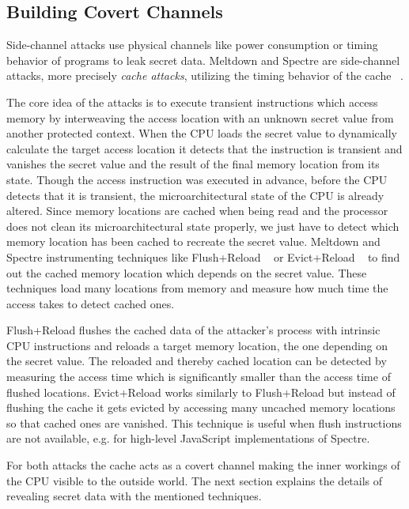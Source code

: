 \documentclass[a4paper,oneside,openright] {scrreprt}
\begin{document}
 \subsection{Building Covert Channels}
\label{ch:intro:motivation:A}

Side-channel attacks use physical channels like power consumption or timing behavior of programs to
leak secret data. Meltdown and Spectre are side-channel attacks, more precisely \textit{cache attacks}, 
utilizing the timing behavior of the cache ~\cite{osvik2006cache}.

The core idea of the attacks is to execute transient instructions 
which access memory by interweaving the access location with an unknown secret value from another protected context. 
When the CPU loads the secret value to dynamically calculate the target access location 
it detects that the instruction is transient and vanishes the secret value and the result of the final memory location from its state. 
Though the access instruction was executed in advance, before the CPU detects that it is transient, the microarchitectural state
 of the CPU is already altered.
 Since memory locations are cached when being read and the processor does not clean its microarchitectural state properly,
 we just have to detect which memory location has been cached to recreate the secret value.
 Meltdown and Spectre instrumenting techniques like Flush+Reload ~\cite{yarom2014flush} 
 or Evict+Reload ~\cite{gruss2015cache} to find out the cached memory location which depends on the secret value.
These techniques load many locations from memory and measure how much time the access takes to detect cached ones.

Flush+Reload flushes the cached data of the attacker's process with intrinsic CPU instructions and reloads a target memory location,
the one depending on the secret value.
The reloaded and thereby cached location can be detected by measuring the access time which is significantly smaller than the access
time of flushed locations.
Evict+Reload works similarly to Flush+Reload but instead of flushing the cache it gets evicted by accessing many uncached memory
locations so that cached ones are vanished.
This technique is useful when flush instructions are not available, e.g. for high-level JavaScript implementations of Spectre. 

For both attacks the cache acts as a covert channel making the inner workings of the CPU visible to the outside world. 
The next section explains the details of revealing secret data with the mentioned techniques. 
\end{document}
